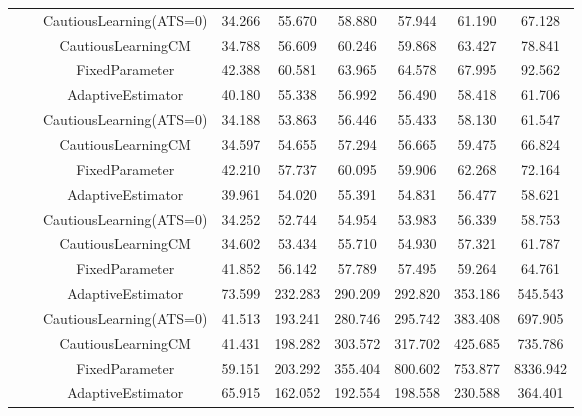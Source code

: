 \begin{table}[!h]
\begin{tabular}[t]{ccccccccc}
 &  & CautiousLearning(ATS=0) & 34.266 & 55.670 & 58.880 & 57.944 & 61.190 & 67.128\\

 &  & CautiousLearningCM & 34.788 & 56.609 & 60.246 & 59.868 & 63.427 & 78.841\\

 & \multirow[t]{-4}{*}{\centering\arraybackslash 1.00} & FixedParameter & 42.388 & 60.581 & 63.965 & 64.578 & 67.995 & 92.562\\
\cmidrule{2-9}
 &  & AdaptiveEstimator & 40.180 & 55.338 & 56.992 & 56.490 & 58.418 & 61.706\\

 &  & CautiousLearning(ATS=0) & 34.188 & 53.863 & 56.446 & 55.433 & 58.130 & 61.547\\

 &  & CautiousLearningCM & 34.597 & 54.655 & 57.294 & 56.665 & 59.475 & 66.824\\

 & \multirow[t]{-4}{*}{\centering\arraybackslash 1.25} & FixedParameter & 42.210 & 57.737 & 60.095 & 59.906 & 62.268 & 72.164\\
\cmidrule{2-9}
 &  & AdaptiveEstimator & 39.961 & 54.020 & 55.391 & 54.831 & 56.477 & 58.621\\

 &  & CautiousLearning(ATS=0) & 34.252 & 52.744 & 54.954 & 53.983 & 56.339 & 58.753\\

 &  & CautiousLearningCM & 34.602 & 53.434 & 55.710 & 54.930 & 57.321 & 61.787\\

\multirow[t]{-28}{*}{\centering\arraybackslash 50} & \multirow[t]{-4}{*}{\centering\arraybackslash 1.50} & FixedParameter & 41.852 & 56.142 & 57.789 & 57.495 & 59.264 & 64.761\\
\cmidrule{1-9}
 &  & AdaptiveEstimator & 73.599 & 232.283 & 290.209 & 292.820 & 353.186 & 545.543\\

 &  & CautiousLearning(ATS=0) & 41.513 & 193.241 & 280.746 & 295.742 & 383.408 & 697.905\\

 &  & CautiousLearningCM & 41.431 & 198.282 & 303.572 & 317.702 & 425.685 & 735.786\\

 & \multirow[t]{-4}{*}{\centering\arraybackslash 0.25} & FixedParameter & 59.151 & 203.292 & 355.404 & 800.602 & 753.877 & 8336.942\\
\cmidrule{2-9}
 &  & AdaptiveEstimator & 65.915 & 162.052 & 192.554 & 198.558 & 230.588 & 364.401\\


\end{tabular}
\end{table}
